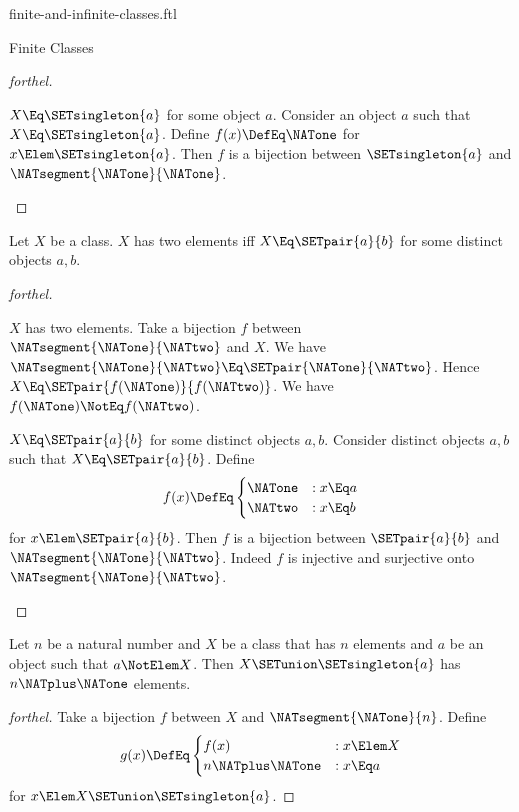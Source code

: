 \documentclass{stex}
\begin{document}
\begin{smodule}{finite-and-infinite-classes.ftl}
\begin{sfragment}{Finite Classes}
\begin{proof}[forthel]
    \begin{case}{$X \Eq \SETsingleton{a}$ for some object $a$.}
      Consider an object $a$ such that $X \Eq \SETsingleton{a}$.
      Define $f(x) \DefEq \NATone$ for $x \Elem \SETsingleton{a}$.
      Then $f$ is a bijection between $\SETsingleton{a}$ and $\NATsegment{\NATone}{\NATone}$.
    \end{case}
  \end{proof}

  \begin{proposition}[forthel]
    Let $X$ be a class.
    $X$ has two elements iff $X \Eq \SETpair{a}{b}$ for some distinct objects $a, b$.
  \end{proposition}
  \begin{proof}[forthel]
    \begin{case}{$X$ has two elements.}
      Take a bijection $f$ between $\NATsegment{\NATone}{\NATtwo}$ and $X$.
      We have $\NATsegment{\NATone}{\NATtwo} \Eq \SETpair{\NATone}{\NATtwo}$.
      Hence $X \Eq \SETpair{f(\NATone)}{f(\NATtwo)}$.
      We have $f(\NATone) \NotEq f(\NATtwo)$.
    \end{case}

    \begin{case}{$X \Eq \SETpair{a}{b}$ for some distinct objects $a, b$.}
      Consider distinct objects $a, b$ such that $X \Eq \SETpair{a}{b}$.
      Define \[f(x) \DefEq
        \begin{cases}
          \NATone & : x \Eq a \\
          \NATtwo & : x \Eq b
        \end{cases}\]
      for $x \Elem \SETpair{a}{b}$.
      Then $f$ is a bijection between $\SETpair{a}{b}$ and $\NATsegment{\NATone}{\NATtwo}$.
      Indeed $f$ is injective and surjective onto $\NATsegment{\NATone}{\NATtwo}$.
    \end{case}
  \end{proof}

  \begin{proposition}[forthel]
    Let $n$ be a natural number and $X$ be a class that has $n$ elements and $a$ be an object such that $a \NotElem X$.
    Then $X \SETunion \SETsingleton{a}$ has $n \NATplus \NATone$ elements.
  \end{proposition}
  \begin{proof}[forthel]
    Take a bijection $f$ between $X$ and $\NATsegment{\NATone}{n}$.
    Define \[g(x) \DefEq
      \begin{cases}
        f(x)  & : x \Elem X \\
        n \NATplus \NATone & : x \Eq a
      \end{cases}\]
    for $x \Elem X \SETunion \SETsingleton{a}$.


\end{proof}
\end{sfragment}
\end{smodule}
\end{document}
